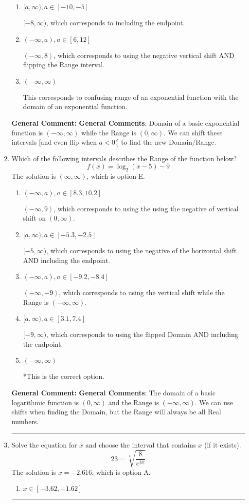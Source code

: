\documentclass{extbook}[14pt]
\newcommand{\litem}[1]{\item #1

\rule{\textwidth}{0.4pt}}
\begin{document}
\begin{enumerate}
{\begin{enumerate}[label=\Alph*.]
* $(-8, \infty)$, which is the correct option.
\item \( [a, \infty), a \in [-10, -5] \)

$[-8, \infty)$, which corresponds to including the endpoint.
\item \( (-\infty, a), a \in [6, 12] \)

$(-\infty, 8)$, which corresponds to using the negative vertical shift AND flipping the Range interval.
\item \( (-\infty, \infty) \)

This corresponds to confusing range of an exponential function with the domain of an exponential function.
\end{enumerate}

\textbf{General Comment:} \textbf{General Comments}: Domain of a basic exponential function is $(-\infty, \infty)$ while the Range is $(0, \infty)$. We can shift these intervals [and even flip when $a<0$!] to find the new Domain/Range.
}
\litem{
Which of the following intervals describes the Range of the function below?
\[ f(x) = \log_2{(x-5)}-9 \]
The solution is \( (\infty, \infty) \), which is option E.\begin{enumerate}[label=\Alph*.]
\item \( (-\infty, a), a \in [8.3, 10.2] \)

$(-\infty, 9)$, which corresponds to using the using the negative of vertical shift on $(0, \infty)$.
\item \( [a, \infty), a \in [-5.3, -2.5] \)

$[-5, \infty)$, which corresponds to using the negative of the horizontal shift AND including the endpoint.
\item \( (-\infty, a), a \in [-9.2, -8.4] \)

$(-\infty, -9)$, which corresponds to using the vertical shift while the Range is $(-\infty, \infty)$.
\item \( [a, \infty), a \in [3.1, 7.4] \)

$[-9, \infty)$, which corresponds to using the flipped Domain AND including the endpoint.
\item \( (-\infty, \infty) \)

*This is the correct option.
\end{enumerate}

\textbf{General Comment:} \textbf{General Comments}: The domain of a basic logarithmic function is $(0, \infty)$ and the Range is $(-\infty, \infty)$. We can use shifts when finding the Domain, but the Range will always be all Real numbers.
}
\litem{
 Solve the equation for $x$ and choose the interval that contains $x$ (if it exists).
\[  23 = \sqrt[4]{\frac{8}{e^{4x}}} \]
The solution is \( x = -2.616 \), which is option A.\begin{enumerate}[label=\Alph*.]
\item \( x \in [-3.62, -1.62] \)


\end{enumerate}}
\end{enumerate}
\end{document}
